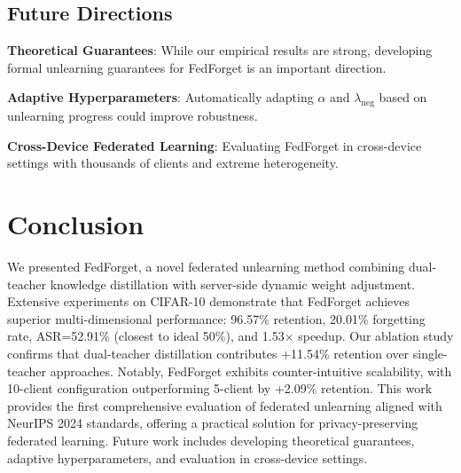 \documentclass[10pt,twocolumn]{article}
\begin{document}
\subsection{Future Directions}

\textbf{Theoretical Guarantees}: While our empirical results are strong, developing formal unlearning guarantees for FedForget is an important direction.

\textbf{Adaptive Hyperparameters}: Automatically adapting $\alpha$ and $\lambda_{\text{neg}}$ based on unlearning progress could improve robustness.

\textbf{Cross-Device Federated Learning}: Evaluating FedForget in cross-device settings with thousands of clients and extreme heterogeneity.

\section{Conclusion}

We presented FedForget, a novel federated unlearning method combining dual-teacher knowledge distillation with server-side dynamic weight adjustment. Extensive experiments on CIFAR-10 demonstrate that FedForget achieves superior multi-dimensional performance: 96.57\% retention, 20.01\% forgetting rate, ASR=52.91\% (closest to ideal 50\%), and 1.53× speedup. Our ablation study confirms that dual-teacher distillation contributes +11.54\% retention over single-teacher approaches. Notably, FedForget exhibits counter-intuitive scalability, with 10-client configuration outperforming 5-client by +2.09\% retention. This work provides the first comprehensive evaluation of federated unlearning aligned with NeurIPS 2024 standards, offering a practical solution for privacy-preserving federated learning. Future work includes developing theoretical guarantees, adaptive hyperparameters, and evaluation in cross-device settings.
\end{document}
